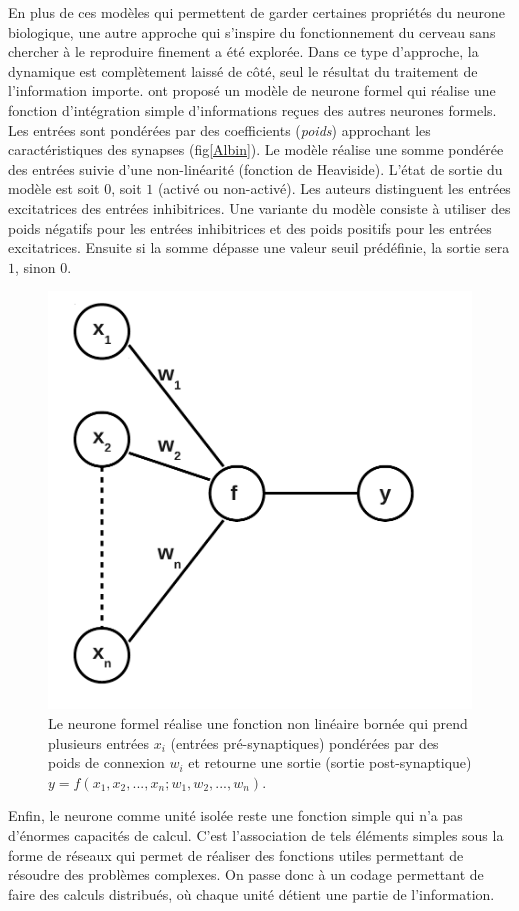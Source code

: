 En plus de ces modèles qui permettent de garder certaines propriétés du neurone biologique, une autre approche qui s'inspire du fonctionnement du cerveau sans chercher à le reproduire finement a été explorée. Dans ce type d'approche, la dynamique est complètement laissé de côté, seul le résultat du traitement de l'information importe. \cite{McCulloch:1943} ont proposé un modèle de neurone formel qui réalise une fonction d'intégration simple d'informations reçues des autres neurones formels. Les entrées sont pondérées par des coefficients (\textit{poids}) approchant les caractéristiques des synapses (fig\ref{Albin}). Le modèle réalise une somme pondérée des entrées suivie d'une non-linéarité (fonction de Heaviside). L'état de sortie du modèle est soit $0$, soit $1$ (activé ou non-activé). Les auteurs distinguent les entrées excitatrices des entrées inhibitrices. Une variante du modèle consiste à utiliser des poids négatifs pour les entrées inhibitrices et des poids positifs pour les entrées excitatrices. Ensuite si la somme dépasse une valeur seuil prédéfinie, la sortie sera $1$, sinon $0$.\\

\begin{figure}[htbp]
\begin{center}
\includegraphics[height=0.3\textwidth]{figures/ch1_6_formel}
\end{center}
\caption{Le neurone formel réalise une fonction non linéaire bornée qui prend plusieurs entrées $x_i$ (entrées pré-synaptiques) pondérées par des poids de connexion $w_i$ et retourne une sortie (sortie post-synaptique) $ y = f (x_1, x_2, ..., x_n; w_1, w_2, ..., w_n)$. }
\label{formel}
\end{figure}

Enfin, le neurone comme unité isolée reste une fonction simple qui n'a pas d'énormes capacités de calcul. C'est l'association de tels éléments simples sous la forme de réseaux qui permet de réaliser des fonctions utiles permettant de résoudre des problèmes complexes. On passe donc à un codage permettant de faire des calculs distribués, o\`u chaque unité détient une partie de l'information.\\

